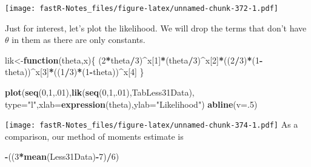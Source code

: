 \documentclass[]{book}
\newenvironment{Shaded}{\begin{snugshade}}{\end{snugshade}}
\newcommand{\KeywordTok}[1]{\textcolor[rgb]{0.13,0.29,0.53}{\textbf{#1}}}
\newcommand{\DataTypeTok}[1]{\textcolor[rgb]{0.13,0.29,0.53}{#1}}
\newcommand{\DecValTok}[1]{\textcolor[rgb]{0.00,0.00,0.81}{#1}}
\newcommand{\StringTok}[1]{\textcolor[rgb]{0.31,0.60,0.02}{#1}}
\newcommand{\ControlFlowTok}[1]{\textcolor[rgb]{0.13,0.29,0.53}{\textbf{#1}}}
\newcommand{\OperatorTok}[1]{\textcolor[rgb]{0.81,0.36,0.00}{\textbf{#1}}}
\newcommand{\NormalTok}[1]{#1}
\theoremstyle{definition}
\theoremstyle{definition}
\theoremstyle{definition}
\theoremstyle{remark}
\begin{document}
\texttt{[image: fastR-Notes\_files/figure-latex/unnamed-chunk-372-1.pdf]}

Just for interest, let's plot the likelihood. We will drop the terms
that don't have \(\theta\) in them as there are only constants.

\begin{Shaded}
\begin{Highlighting}[]
\NormalTok{lik<-}\ControlFlowTok{function}\NormalTok{(theta,x)\{}
\NormalTok{    (}\DecValTok{2}\OperatorTok{*}\NormalTok{theta}\OperatorTok{/}\DecValTok{3}\NormalTok{)}\OperatorTok{^}\NormalTok{x[}\DecValTok{1}\NormalTok{]}\OperatorTok{*}\NormalTok{(theta}\OperatorTok{/}\DecValTok{3}\NormalTok{)}\OperatorTok{^}\NormalTok{x[}\DecValTok{2}\NormalTok{]}\OperatorTok{*}\NormalTok{((}\DecValTok{2}\OperatorTok{/}\DecValTok{3}\NormalTok{)}\OperatorTok{*}\NormalTok{(}\DecValTok{1}\OperatorTok{-}\NormalTok{theta))}\OperatorTok{^}\NormalTok{x[}\DecValTok{3}\NormalTok{]}\OperatorTok{*}\NormalTok{((}\DecValTok{1}\OperatorTok{/}\DecValTok{3}\NormalTok{)}\OperatorTok{*}\NormalTok{(}\DecValTok{1}\OperatorTok{-}\NormalTok{theta))}\OperatorTok{^}\NormalTok{x[}\DecValTok{4}\NormalTok{]}
\NormalTok{    \}}
\end{Highlighting}
\end{Shaded}

\begin{Shaded}
\begin{Highlighting}[]
\KeywordTok{plot}\NormalTok{(}\KeywordTok{seq}\NormalTok{(}\DecValTok{0}\NormalTok{,}\DecValTok{1}\NormalTok{,.}\DecValTok{01}\NormalTok{),}\KeywordTok{lik}\NormalTok{(}\KeywordTok{seq}\NormalTok{(}\DecValTok{0}\NormalTok{,}\DecValTok{1}\NormalTok{,.}\DecValTok{01}\NormalTok{),TabLess31Data),}
     \DataTypeTok{type=}\StringTok{"l"}\NormalTok{,}\DataTypeTok{xlab=}\KeywordTok{expression}\NormalTok{(theta),}\DataTypeTok{ylab=}\StringTok{"Likelihood"}\NormalTok{)}
\KeywordTok{abline}\NormalTok{(}\DataTypeTok{v=}\NormalTok{.}\DecValTok{5}\NormalTok{)}
\end{Highlighting}
\end{Shaded}

\texttt{[image: fastR-Notes\_files/figure-latex/unnamed-chunk-374-1.pdf]}
As a comparison, our method of moments estimate is

\begin{Shaded}
\begin{Highlighting}[]
\OperatorTok{-}\NormalTok{((}\DecValTok{3}\OperatorTok{*}\KeywordTok{mean}\NormalTok{(Less31Data)}\OperatorTok{-}\DecValTok{7}\NormalTok{)}\OperatorTok{/}\DecValTok{6}\NormalTok{)}
\end{Highlighting}
\end{Shaded}
\end{document}

